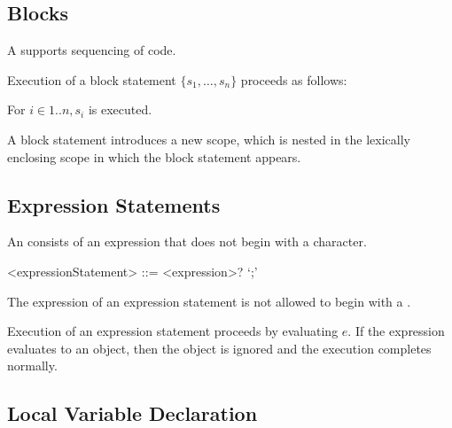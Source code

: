 \documentclass[makeidx]{article}
\begin{document}
{%


\subsection{Blocks}

\LMHash{}%
A  supports sequencing of code.

\LMHash{}%
Execution of a block statement $\{s_1, \ldots, s_n\}$ proceeds as follows:

\LMHash{}%
For $i \in 1 .. n, s_i$ is executed.

\LMHash{}%
A block statement introduces a new scope, which is nested in the lexically enclosing scope in which the block statement appears.


\subsection{Expression Statements}

\LMHash{}%
An  consists of an expression that does not
begin with a \lit{\{} character.

\begin{grammar}
<expressionStatement> ::= <expression>? `;'
\end{grammar}

\LMHash{}%
The expression of an expression statement is not allowed
to begin with a \lit{\{}.

\LMHash{}%
Execution of an expression statement  proceeds by evaluating $e$.
If the expression evaluates to an object,
then the object is ignored and the execution completes normally.


\subsection{Local Variable Declaration}

}
\end{document}
